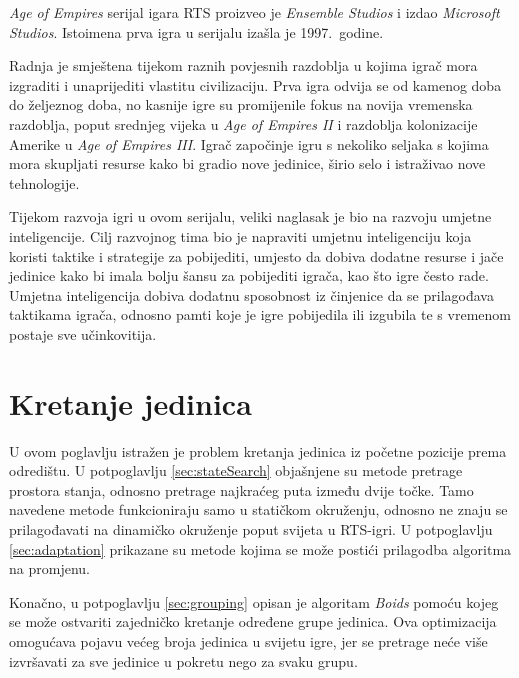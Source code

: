 \documentclass[times, utf8, zavrsni, numeric]{fer}
\begin{document}
\par \textit{Age of Empires} serijal igara RTS proizveo je \textit{Ensemble Studios} i izdao \textit{Microsoft Studios}. 
Istoimena prva igra u serijalu izašla je 1997.\ godine.

\par Radnja je smještena tijekom raznih povjesnih razdoblja u kojima igrač mora izgraditi i unaprijediti vlastitu civilizaciju.
Prva igra odvija se od kamenog doba do željeznog doba, no kasnije igre su promijenile fokus na novija vremenska razdoblja, poput srednjeg vijeka u \textit{Age of Empires II} i razdoblja kolonizacije Amerike u \textit{Age of Empires III}.
Igrač započinje igru s nekoliko seljaka s kojima mora skupljati resurse kako bi gradio nove jedinice, širio selo i istraživao nove tehnologije.

\par Tijekom razvoja igri u ovom serijalu, veliki naglasak je bio na razvoju umjetne inteligencije.
Cilj razvojnog tima bio je napraviti umjetnu inteligenciju koja koristi taktike i strategije za pobijediti, umjesto da dobiva dodatne resurse i jače jedinice kako bi imala bolju šansu za pobijediti igrača, kao što igre često rade.
Umjetna inteligencija dobiva dodatnu sposobnost iz činjenice da se prilagođava taktikama igrača, odnosno pamti koje je igre pobijedila ili izgubila te s vremenom postaje sve učinkovitija.  

\chapter{Kretanje jedinica}\label{ch:pathfinding}

\par U ovom poglavlju istražen je problem kretanja jedinica iz početne pozicije prema odredištu. 
U potpoglavlju \ref{sec:stateSearch} objašnjene su metode pretrage prostora stanja, odnosno pretrage najkraćeg puta između dvije točke.
Tamo navedene metode funkcioniraju samo u statičkom okruženju, odnosno ne znaju se prilagođavati na dinamičko okruženje poput svijeta u RTS-igri.
U potpoglavlju \ref{sec:adaptation} prikazane su metode kojima se može postići prilagodba algoritma na promjenu.

\par Konačno, u potpoglavlju \ref{sec:grouping} opisan je algoritam \textit{Boids} pomoću kojeg se može ostvariti zajedničko kretanje određene grupe jedinica.
Ova optimizacija omogućava pojavu većeg broja jedinica u svijetu igre, jer se pretrage neće više izvršavati za sve jedinice u pokretu nego za svaku grupu.
\end{document}
